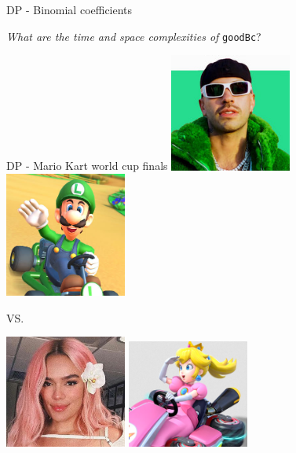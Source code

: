 \documentclass{beamer}
\begin{document}
%

\begin{frame}{DP - Binomial coefficients}
	
	\emph{What are the time and space complexities of} \texttt{goodBc}?
\end{frame}

\begin{frame}{DP - Mario Kart world cup finals}
	\centering
	\includegraphics[width=0.3\textwidth]{feid.png}
	\includegraphics[width=0.3\textwidth]{luigi.png}

	VS.

	\medskip
	\includegraphics[width=0.3\textwidth]{karolg.png}
	\includegraphics[width=0.3\textwidth]{peach.png}
\end{frame}

%
\end{document}
